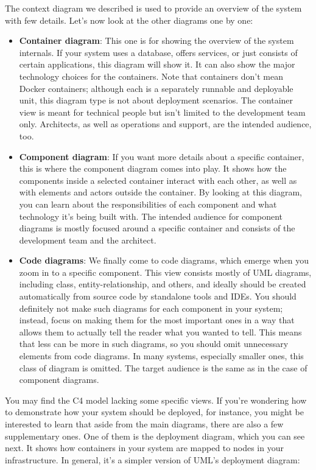 The context diagram we described is used to provide an overview of the system with few details. Let's now look at the other diagrams one by one:


\begin{itemize}
\item
\textbf{Container diagram}: This one is for showing the overview of the system internals. If your system uses a database, offers services, or just consists of certain applications, this diagram will show it. It can also show the major technology choices for the containers. Note that containers don't mean Docker containers; although each is a separately runnable and deployable unit, this diagram type is not about deployment scenarios. The container view is meant for technical people but isn't limited to the development team only. Architects, as well as operations and support, are the intended audience, too.


\item 
\textbf{Component diagram}: If you want more details about a specific container, this is where the component diagram comes into play. It shows how the components inside a selected container interact with each other, as well as with elements and actors outside the container. By looking at this diagram, you can learn about the responsibilities of each component and what technology it's being built with. The intended audience for component diagrams is mostly focused around a specific container and consists of the development team and the architect.


\item
\textbf{Code diagrams}: We finally come to code diagrams, which emerge when you zoom in to a specific component. This view consists mostly of UML diagrams, including class, entity-relationship, and others, and ideally should be created automatically from source code by standalone tools and IDEs. You should definitely not make such diagrams for each component in your system; instead, focus on making them for the most important ones in a way that allows them to actually tell the reader what you wanted to tell. This means that less can be more in such diagrams, so you should omit unnecessary elements from code diagrams. In many systems, especially smaller ones, this class of diagram is omitted. The target audience is the same as in the case of component diagrams.

\end{itemize}

You may find the C4 model lacking some specific views. If you're wondering how to demonstrate how your system should be deployed, for instance, you might be interested to learn that aside from the main diagrams, there are also a few supplementary ones. One of them is the deployment diagram, which you can see next. It shows how containers in your system are mapped to nodes in your infrastructure. In general, it's a simpler version of UML's deployment diagram:

